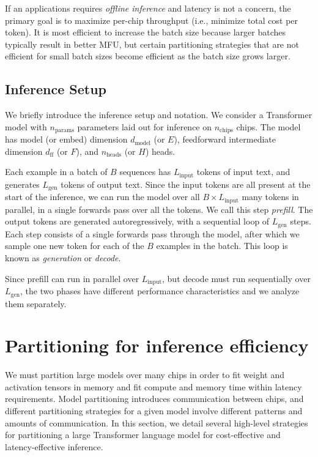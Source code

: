 If an applications requires \emph{offline inference} and latency is not a concern, the primary goal is to maximize per-chip throughput (i.e., minimize total cost per token). It is most efficient to increase the batch size because larger batches typically result in better MFU, but certain partitioning strategies that are not efficient for small batch sizes become efficient as the batch size grows larger. 

\subsection{Inference Setup} We briefly introduce the inference setup and notation. We consider a Transformer model with $n_{\textrm{params}}$ parameters laid out for inference on $n_{\textrm{chips}}$ chips. The model has model (or embed) dimension $d_{\textrm{model}}$ (or $E$), feedforward intermediate dimension $d_{\textrm{ff}}$ (or $F$), and $n_{\textrm{heads}}$ (or $H$) heads.

Each example in a batch of $B$ sequences has $L_{\textrm{input}}$ tokens of input text, and generates $L_{\textrm{gen}}$ tokens of output text. Since the input tokens are all present at the start of the inference, we can run the model over all $B\times L_{\textrm{input}}$ many tokens in parallel, in a single forwards pass over all the tokens. We call this step \emph{prefill}. The output tokens are generated autoregressively, with a sequential loop of
$L_{\textrm{gen}}$ steps. Each step consists of a single forwards pass through the model, after which we sample one new token for each of the $B$ examples in the batch. This loop is known as \emph{generation} or \emph{decode}.

Since prefill can run in parallel over $L_{\textrm{input}}$, but decode must run sequentially over $L_{\textrm{gen}}$, the two phases have different performance characteristics and we analyze them separately.

\section{Partitioning for inference efficiency}\label{sec:design}
We must partition large models over many chips in order to fit weight and activation tensors in memory and fit compute and memory time within latency requirements. Model partitioning introduces communication between chips, and different partitioning strategies for a given model involve different patterns and amounts of communication. In this section, we detail several high-level strategies for partitioning a large Transformer language model for cost-effective and latency-effective inference.

